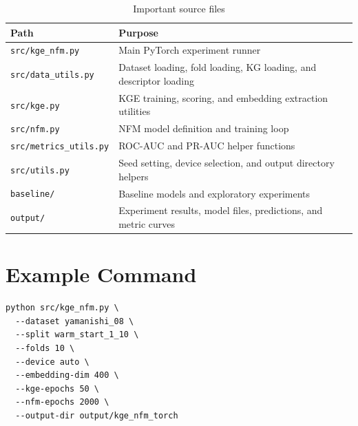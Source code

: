 \begin{table}[H]
\centering
\caption{Important source files}
\label{tab:source_files}
\begin{tabularx}{\textwidth}{lX}
\toprule
\textbf{Path} & \textbf{Purpose} \\
\midrule
\texttt{src/kge\_nfm.py} & Main PyTorch experiment runner \\
\texttt{src/data\_utils.py} & Dataset loading, fold loading, KG loading, and descriptor loading \\
\texttt{src/kge.py} & KGE training, scoring, and embedding extraction utilities \\
\texttt{src/nfm.py} & NFM model definition and training loop \\
\texttt{src/metrics\_utils.py} & ROC-AUC and PR-AUC helper functions \\
\texttt{src/utils.py} & Seed setting, device selection, and output directory helpers \\
\texttt{baseline/} & Baseline models and exploratory experiments \\
\texttt{output/} & Experiment results, model files, predictions, and metric curves \\
\bottomrule
\end{tabularx}
\end{table}


\section{Example Command}

\begin{lstlisting}[caption={Example KGE-NFM experiment command}]
python src/kge_nfm.py \
  --dataset yamanishi_08 \
  --split warm_start_1_10 \
  --folds 10 \
  --device auto \
  --embedding-dim 400 \
  --kge-epochs 50 \
  --nfm-epochs 2000 \
  --output-dir output/kge_nfm_torch
\end{lstlisting}
